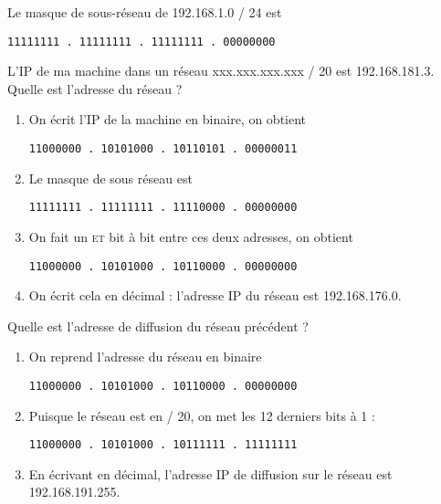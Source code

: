 \documentclass[a4paper,12pt,french]{article}
\begin{document}
\begin{exemple}
Le masque de sous-réseau de 192.168.1.0 / 24 est
\begin{center}
\texttt{11111111 . 11111111 . 11111111 . 00000000}
\end{center}
\end{exemple}

\begin{methode}
L'IP de ma machine dans un réseau xxx.xxx.xxx.xxx / 20 est 192.168.181.3.\\

Quelle est l'adresse du réseau ?
\begin{enumerate}[--]
	\item On écrit l'IP de la machine en binaire, on obtient 
	\begin{center}\texttt{11000000 . 10101000 . 10110101 . 00000011}\end{center}
	\item Le masque de sous réseau est 
	\begin{center}\texttt{11111111 . 11111111 . 11110000 . 00000000}\end{center}
	\item On fait un \textsc{et} bit à bit entre ces deux adresses, on obtient 
	\begin{center}\texttt{11000000 . 10101000 . 10110000 . 00000000}\end{center}
	\item On écrit cela en décimal : l'adresse IP du réseau est 192.168.176.0.\\
\end{enumerate}
\end{methode}
\begin{methode}
Quelle est l'adresse de diffusion du réseau précédent ?
\begin{enumerate}[--]
	\item On reprend l'adresse du réseau en binaire 
	\begin{center}\texttt{11000000 . 10101000 . 10110000 . 00000000}\end{center}
	\item Puisque le réseau est en / 20, on met les 12 derniers bits à 1 :
	\begin{center}\texttt{11000000 . 10101000 . 10111111 . 11111111}\end{center}
	\item En écrivant en décimal, l'adresse IP de diffusion sur le réseau est 192.168.191.255.
\end{enumerate}

\end{methode}
\end{document}
